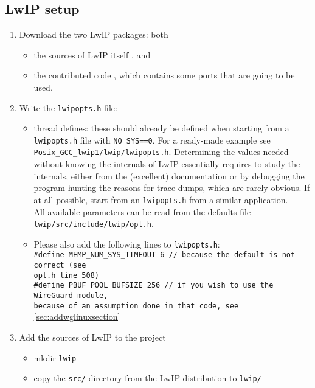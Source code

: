 \subsection{LwIP setup}
\begin{enumerate}
    \item Download the two LwIP packages: both
    \begin{itemize}
        \item the sources of LwIP itself \cite{lwip_download}, and
        \item the contributed code \cite{lwip_contrib_download}, which contains some ports that are going to be used.
    \end{itemize}
    \item Write the \texttt{lwipopts.h} file:
    \begin{itemize}
        \item thread defines: these should already be defined when starting from a \texttt{lwipopts.h} file with \texttt{NO\_SYS==0}. For a ready-made example see \texttt{Posix\_GCC\_lwip1/lwip/lwipopts.h}. Determining the values needed without knowing the internals of LwIP essentially requires to study the internals, either from the (excellent) documentation or by debugging the program hunting the reasons for trace dumps, which are rarely obvious. If at all possible, start from an \texttt{lwipopts.h} from a similar application.\\
        All available parameters can be read from the defaults file \texttt{lwip/src/include/lwip/opt.h}.
        \item Please also add the following lines to \texttt{lwipopts.h}:\\
        \texttt{\#define MEMP\_NUM\_SYS\_TIMEOUT    6   // because the default is not correct (see\\opt.h line 508)}\\
        \texttt{\#define PBUF\_POOL\_BUFSIZE        256 // if you wish to use the WireGuard module,\\because of an assumption done in that code, see} \ref{sec:addwglinuxsection}
    \end{itemize}
    \item Add the sources of LwIP to the project
    \begin{itemize}
        \item mkdir \texttt{lwip}
        \item copy the \texttt{src/} directory from the LwIP distribution to \texttt{lwip/}
    \end{itemize}

\end{enumerate}
